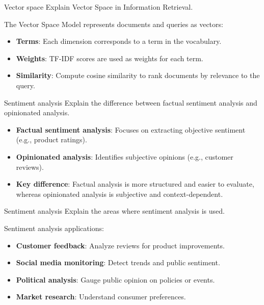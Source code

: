 \documentclass{article}
\begin{document}
\begin{exercise}{Vector space}
  Explain Vector Space in Information Retrieval.

  \begin{solution}
    The Vector Space Model represents documents and queries as vectors:
    \begin{itemize}
        \item \textbf{Terms}: Each dimension corresponds to a term in the vocabulary.
        \item \textbf{Weights}: TF-IDF scores are used as weights for each term.
        \item \textbf{Similarity}: Compute cosine similarity to rank documents by relevance to the query.
    \end{itemize}
  \end{solution}
\end{exercise}

\begin{exercise}{Sentiment analysis}
  Explain the difference between factual sentiment analysis and opinionated analysis.

  \begin{solution}
    \begin{itemize}
        \item \textbf{Factual sentiment analysis}: Focuses on extracting objective sentiment (e.g., product ratings).
        \item \textbf{Opinionated analysis}: Identifies subjective opinions (e.g., customer reviews).
        \item \textbf{Key difference}: Factual analysis is more structured and easier to evaluate, whereas opinionated analysis is subjective and context-dependent.
    \end{itemize}
  \end{solution}
\end{exercise}

\begin{exercise}{Sentiment analysis}
  Explain the areas where sentiment analysis is used.

  \begin{solution}
    Sentiment analysis applications:
    \begin{itemize}
        \item \textbf{Customer feedback}: Analyze reviews for product improvements.
        \item \textbf{Social media monitoring}: Detect trends and public sentiment.
        \item \textbf{Political analysis}: Gauge public opinion on policies or events.
        \item \textbf{Market research}: Understand consumer preferences.
    \end{itemize}
  \end{solution}
\end{exercise}
\end{document}
